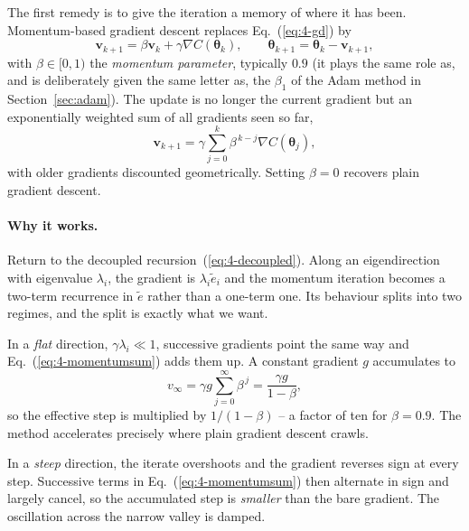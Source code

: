 The first remedy is to give the iteration a memory of where it has been.
Momentum-based gradient descent replaces Eq.~(\ref{eq:4-gd}) by
\begin{equation}
  \bm{v}_{k+1} = \beta\bm{v}_k + \gamma\nabla C(\bm{\theta}_k),
  \qquad
  \bm{\theta}_{k+1} = \bm{\theta}_k - \bm{v}_{k+1},
  \label{eq:4-momentum}
\end{equation}
with $\beta\in[0,1)$ the \emph{momentum parameter}, typically $0.9$ (it plays
the same role as, and is deliberately given the same letter as, the $\beta_1$
of the Adam method in Section~\ref{sec:adam}).  The
update is no longer the current gradient but an exponentially weighted sum of
all gradients seen so far,
\begin{equation}
  \bm{v}_{k+1} = \gamma\sum_{j=0}^{k}\beta^{\,k-j}\nabla C(\bm{\theta}_j),
  \label{eq:4-momentumsum}
\end{equation}
with older gradients discounted geometrically.  Setting $\beta=0$ recovers
plain gradient descent.

\paragraph{Why it works.}
Return to the decoupled recursion~(\ref{eq:4-decoupled}).  Along an
eigendirection with eigenvalue $\lambda_i$, the gradient is
$\lambda_i\tilde{e}_i$ and the momentum iteration becomes a two-term
recurrence in $\tilde{e}$ rather than a one-term one.  Its behaviour splits
into two regimes, and the split is exactly what we want.

In a \emph{flat} direction, $\gamma\lambda_i\ll1$, successive gradients point
the same way and Eq.~(\ref{eq:4-momentumsum}) adds them up.  A constant
gradient $g$ accumulates to
\begin{equation}
  v_\infty = \gamma g \sum_{j=0}^{\infty}\beta^{\,j} = \frac{\gamma g}{1-\beta},
  \label{eq:4-momentumgain}
\end{equation}
so the effective step is multiplied by $1/(1-\beta)$ -- a factor of ten for
$\beta=0.9$.  The method accelerates precisely where plain gradient descent
crawls.

In a \emph{steep} direction, the iterate overshoots and the gradient reverses
sign at every step.  Successive terms in Eq.~(\ref{eq:4-momentumsum}) then
alternate in sign and largely cancel, so the accumulated step is
\emph{smaller} than the bare gradient.  The oscillation across the narrow
valley is damped.

